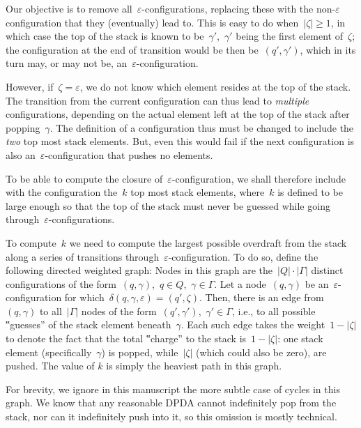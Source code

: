 Our objective is to remove all~$ε$-configurations,
  replacing these with the non-$ε$ configuration that
  they (eventually) lead to.
This is easy to do when~$|ζ|≥1$, in which
  case the top of the stack is known to be~$γ'$,~$γ'$ being the first
    element of~$ζ$; the configuration at the end of transition
    would be then be~$(q',γ')$, which in its turn may, or may not be,
    an~$ε$-configuration.

However, if~$ζ=ε$, we do not know which element resides at the top
  of the stack.
The transition from the current configuration can thus lead to \emph{multiple} configurations,
  depending on the actual element left at the top of the stack after popping~$γ$.
The definition of a configuration thus must be changed to include the \emph{two} top
  most stack elements.
But, even this would fail if the next configuration is also an~$ε$-configuration that pushes no elements.

To be able to compute the closure of~$ε$-configuration, we shall
  therefore include with the configuration the~$k$ top most stack elements,
  where~$k$ is defined to be large enough so that
  the top of the stack must never be guessed while going
  through~$ε$-configurations.

To compute~$k$ we need to compute the largest possible overdraft
  from the stack along a series of transitions through~$ε$-configuration.
To do so, define the following directed weighted graph:
Nodes in this graph are the~$|Q|·|Γ|$ distinct configurations
  of the form~$(q,γ)$,~$q∈Q$,~$γ∈Γ$.
Let a node~$(q,γ)$ be an~$ε$-configuration for which~$δ(q,γ,ε)=(q',ζ)$.
Then, there is an edge from~$(q,γ)$ to all~$|Γ|$ nodes of the form~$(q',γ')$,~$γ'∈Γ$, i.e.,
  to all possible ‟guesses” of the stack element beneath~$γ$.
Each such edge takes the weight~$1-|ζ|$ to denote the fact
  that the total ‟charge” to the stack is~$1-|ζ|$:
    one stack element (specifically~$γ$) is popped,
    while~$|ζ|$ (which could also be zero), are pushed.
The value of $k$ is simply the heaviest path in this graph. 

For brevity, we ignore in this manuscript the 
  more subtle case of cycles in this graph.
We know that any reasonable DPDA cannot indefinitely pop from the stack,
  nor can it indefinitely push into it,
  so this omission is mostly technical.

